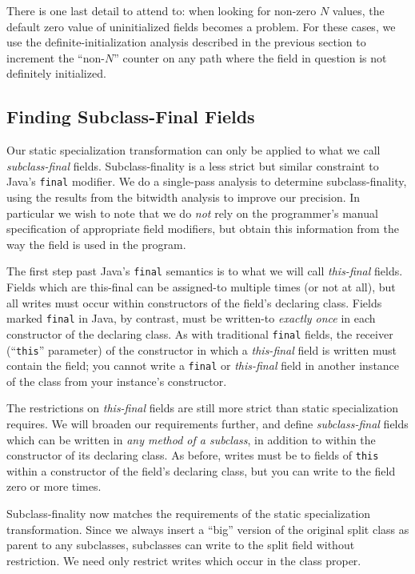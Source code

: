 \documentclass{acmconf}
\begin{document}
There is one last detail to attend to:  when looking for non-zero $N$
values, the default zero value of
uninitialized fields becomes a problem.  For these cases, we use the
definite-initialization analysis described in the previous section to
increment the
``non-$N$'' counter on any path where the field in question is not
definitely initialized.

\subsection{Finding Subclass-Final Fields}
\label{sec:subclass-final}
Our static specialization transformation can only be applied to what
we call {\it subclass-final} fields.  Subclass-finality is a less strict
but similar constraint to Java's {\tt final} modifier.  We do a
single-pass analysis to determine subclass-finality, using the results
from the bitwidth analysis to improve our precision.  In particular we
wish to note that we do {\it not} rely on the programmer's manual
specification of appropriate field modifiers, but obtain this
information from the way the field is used in the program.

The first step past Java's {\tt final} semantics is to what we
will call {\it this-final} fields.  Fields which are this-final can
be assigned-to multiple times (or not at all), but all writes must
occur within constructors of the field's declaring class.
Fields marked {\tt final} in Java, by
contrast, must be written-to {\it exactly once} in each constructor of
the declaring class.
As with traditional {\tt final} fields, the receiver (``{\tt this}''
parameter) of the
constructor in which a {\it this-final} field is written must contain
the field;  you cannot write a {\tt final} or {\it this-final}
field in another instance of the class from your instance's
constructor.

The restrictions on {\it this-final} fields are still more strict than
static specialization requires.  We will broaden our requirements
further, and define
{\it subclass-final} fields which can be written in {\it any method of
  a subclass}, in addition to within the constructor of its declaring
class.  As before, writes must be to fields of {\tt this} within a
constructor of the field's declaring class, but you
can write to the field zero or more times.

Subclass-finality now matches the requirements of the static
specialization transformation.  Since we always insert a ``big''
version of the original split class as parent to any subclasses,
subclasses can write to the split field without restriction.
We need only restrict writes which occur in the class proper.
\end{document}
